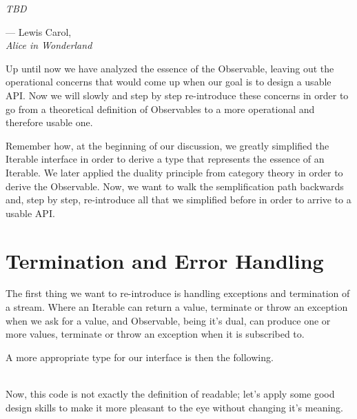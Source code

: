 \let\textcircled=\pgftextcircled
{}
\label{chap:outoftherabbithole}

\epigraph{\hspace{4ex}\textit{TBD}}{--- Lewis Carol,\\ \textit{Alice in Wonderland}}



Up until now we have analyzed the essence of the Observable, leaving out the operational concerns that would come up when our goal is to design a usable API. Now we will slowly and step by step re-introduce these concerns in order to go from a theoretical definition of Observables to a more operational and therefore usable one.

Remember how, at the beginning of our discussion, we greatly simplified the Iterable interface in order to derive a type that represents the essence of an Iterable. We later applied the duality principle from category theory in order to derive the Observable. Now, we want to walk the semplification path backwards and, step by step, re-introduce all that we simplified before in order to arrive to a usable API.

\section{Termination and Error Handling}

The first thing we want to re-introduce is handling exceptions and termination of a stream. Where an Iterable can return a value, terminate or throw an exception when we ask for a value, and Observable, being it's dual, can produce one or more values, terminate or throw an exception when it is subscribed to. 

A more appropriate type for our interface is then the following.\\

\\


Now, this code is not exactly the definition of readable; let's apply some good design skills to make it more pleasant to the eye without changing it's meaning.\\

